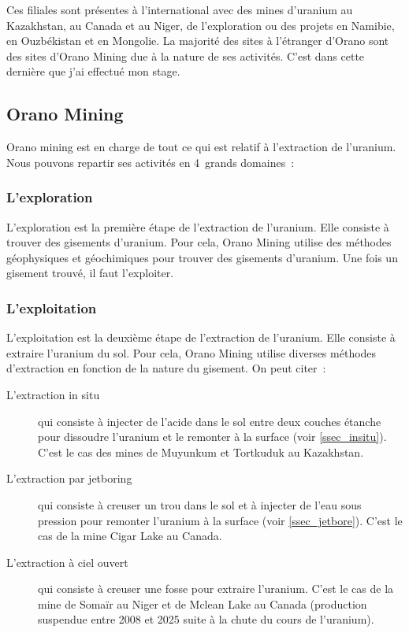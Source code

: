 Ces filiales sont présentes à l'international avec des mines d'uranium au Kazakhstan, au Canada et au Niger, de l'exploration ou des projets en Namibie, en Ouzbékistan et en Mongolie. La majorité des sites à l'étranger d'Orano sont des sites d'Orano Mining due à la nature de ses activités. C'est dans cette dernière que j'ai effectué mon stage.
\subsection{Orano Mining}

Orano mining est en charge de tout ce qui est relatif à l'extraction de l'uranium. Nous pouvons repartir ses activités en 4~grands domaines~:
\subsubsection{L'exploration}
L'exploration est la première étape de l'extraction de l'uranium. Elle consiste à trouver des gisements d'uranium. Pour cela, Orano Mining utilise des méthodes géophysiques et géochimiques pour trouver des gisements d'uranium. Une fois un gisement trouvé, il faut l'exploiter.

\subsubsection{L'exploitation}
L'exploitation est la deuxième étape de l'extraction de l'uranium. Elle consiste à extraire l'uranium du sol. Pour cela, Orano Mining utilise diverses méthodes d'extraction en fonction de la nature du gisement. On peut citer~:
\begin{description}
\item [L'extraction in situ] qui consiste à injecter de l'acide dans le sol entre deux couches étanche pour dissoudre l'uranium et le remonter à la surface (voir \cref{ssec_insitu}). C'est le cas des mines de Muyunkum et Tortkuduk au Kazakhstan.
\item [L'extraction par jetboring]qui consiste à creuser un trou dans le sol et à injecter de l'eau sous pression pour remonter l'uranium à la surface (voir \cref{ssec_jetbore}). C'est le cas de la mine Cigar Lake au Canada.
\item [L'extraction à ciel ouvert]qui consiste à creuser une fosse pour extraire l'uranium. C'est le cas de la mine de Somaïr au Niger et de Mclean Lake au Canada (production suspendue entre 2008 et 2025 suite à la chute du cours de l'uranium).
\end{description}


